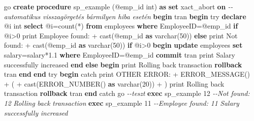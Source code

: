 \documentclass[
  magyar,
]{article}
\newenvironment{Shaded}{}{}
\newcommand{\CommentTok}[1]{\textcolor[rgb]{0.38,0.63,0.69}{\textit{#1}}}
\newcommand{\ControlFlowTok}[1]{\textcolor[rgb]{0.00,0.44,0.13}{\textbf{#1}}}
\newcommand{\DataTypeTok}[1]{\textcolor[rgb]{0.56,0.13,0.00}{#1}}
\newcommand{\DecValTok}[1]{\textcolor[rgb]{0.25,0.63,0.44}{#1}}
\newcommand{\FloatTok}[1]{\textcolor[rgb]{0.25,0.63,0.44}{#1}}
\newcommand{\FunctionTok}[1]{\textcolor[rgb]{0.02,0.16,0.49}{#1}}
\newcommand{\KeywordTok}[1]{\textcolor[rgb]{0.00,0.44,0.13}{\textbf{#1}}}
\newcommand{\NormalTok}[1]{#1}
\newcommand{\OperatorTok}[1]{\textcolor[rgb]{0.40,0.40,0.40}{#1}}
\newcommand{\StringTok}[1]{\textcolor[rgb]{0.25,0.44,0.63}{#1}}
\begin{document}
\begin{Shaded}
\begin{Highlighting}[]
\NormalTok{go}
\KeywordTok{create} \KeywordTok{procedure}\NormalTok{ sp\_example (@emp\_id }\DataTypeTok{int}\NormalTok{)}
\KeywordTok{as}
\KeywordTok{set}\NormalTok{ xact\_abort }\KeywordTok{on} \CommentTok{{-}{-}automatikus visszagörgetés bármilyen hiba esetén}
\ControlFlowTok{begin}\NormalTok{ tran}
\ControlFlowTok{begin}\NormalTok{ try}
    \KeywordTok{declare}\NormalTok{ @i }\DataTypeTok{int}
    \KeywordTok{select}\NormalTok{ @i}\OperatorTok{=}\FunctionTok{count}\NormalTok{(}\OperatorTok{*}\NormalTok{) }\KeywordTok{from}\NormalTok{ employees }\KeywordTok{where}\NormalTok{ EmployeeID}\OperatorTok{=}\NormalTok{@emp\_id}
    \ControlFlowTok{if}\NormalTok{ @i}\OperatorTok{\textgreater{}}\DecValTok{0}\NormalTok{ print }\StringTok{\textquotesingle{}Employee found: \textquotesingle{}} \OperatorTok{+} \FunctionTok{cast}\NormalTok{(@emp\_id }\KeywordTok{as} \DataTypeTok{varchar}\NormalTok{(}\DecValTok{50}\NormalTok{))}
    \ControlFlowTok{else}\NormalTok{ print }\StringTok{\textquotesingle{}Not found: \textquotesingle{}} \OperatorTok{+} \FunctionTok{cast}\NormalTok{(@emp\_id }\KeywordTok{as} \DataTypeTok{varchar}\NormalTok{(}\DecValTok{50}\NormalTok{))}
    \ControlFlowTok{if}\NormalTok{ @i}\OperatorTok{\textgreater{}}\DecValTok{0} \ControlFlowTok{begin}
        \KeywordTok{update}\NormalTok{ employees }\KeywordTok{set}\NormalTok{ salary}\OperatorTok{=}\NormalTok{salary}\OperatorTok{*}\FloatTok{1.1} \KeywordTok{where}\NormalTok{ EmployeeID}\OperatorTok{=}\NormalTok{@emp\_id}
        \KeywordTok{commit}\NormalTok{ tran}
\NormalTok{        print }\StringTok{\textquotesingle{}Salary successfully increased\textquotesingle{}}
    \ControlFlowTok{end} \ControlFlowTok{else} \ControlFlowTok{begin}
\NormalTok{        print }\StringTok{\textquotesingle{}Rolling back transaction\textquotesingle{}}
        \KeywordTok{rollback}\NormalTok{ tran}
    \ControlFlowTok{end}
\ControlFlowTok{end}\NormalTok{ try}
\ControlFlowTok{begin}\NormalTok{ catch}
\NormalTok{    print }\StringTok{\textquotesingle{}OTHER ERROR: \textquotesingle{}}\OperatorTok{+}\NormalTok{ ERROR\_MESSAGE() }\OperatorTok{+} \StringTok{\textquotesingle{} (\textquotesingle{}} \OperatorTok{+} \FunctionTok{cast}\NormalTok{(ERROR\_NUMBER() }\KeywordTok{as} \DataTypeTok{varchar}\NormalTok{(}\DecValTok{20}\NormalTok{)) }\OperatorTok{+} \StringTok{\textquotesingle{})\textquotesingle{}}
\NormalTok{    print }\StringTok{\textquotesingle{}Rolling back transaction\textquotesingle{}}
    \KeywordTok{rollback}\NormalTok{ tran}
\ControlFlowTok{end}\NormalTok{ catch}
\NormalTok{go}
\CommentTok{{-}{-}teszt}
\KeywordTok{exec}\NormalTok{ sp\_example }\DecValTok{12}  \CommentTok{{-}{-}Not found: 12 Rolling back transaction}
\KeywordTok{exec}\NormalTok{ sp\_example }\DecValTok{11}  \CommentTok{{-}{-}Employee found: 11 Salary successfully increased}
\end{Highlighting}
\end{Shaded}
\end{document}

